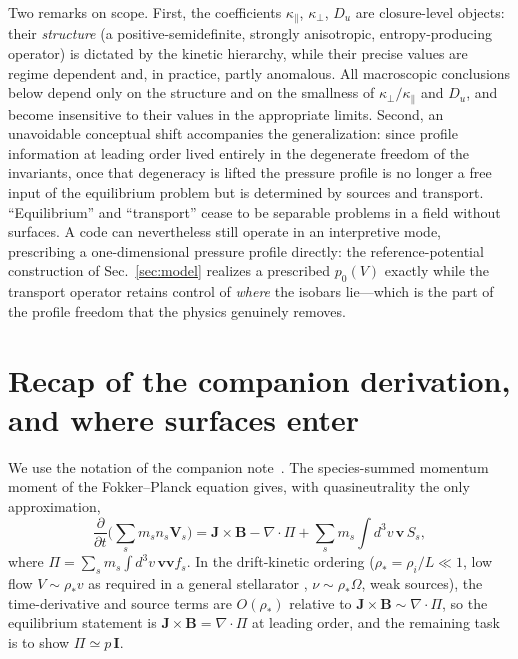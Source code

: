 \documentclass[english]{article}
\newcommand{\bB}{\mathbf{B}}
\newcommand{\bJ}{\mathbf{J}}
\newcommand{\bv}{\mathbf{v}}
\newcommand{\bV}{\mathbf{V}}
\newcommand{\bI}{\mathbf{I}}
\begin{document}
Two remarks on scope. First, the coefficients $\kappa_\parallel$, $\kappa_\perp$, $D_u$ are
closure-level objects: their \emph{structure} (a positive-semidefinite, strongly anisotropic,
entropy-producing operator) is dictated by the kinetic hierarchy, while their precise values are
regime dependent and, in practice, partly anomalous. All macroscopic conclusions below depend only
on the structure and on the smallness of $\kappa_\perp/\kappa_\parallel$ and $D_u$, and become
insensitive to their values in the appropriate limits. Second, an unavoidable conceptual shift
accompanies the generalization: since profile information at leading order lived entirely in the
degenerate freedom of the invariants, once that degeneracy is lifted the pressure profile is no
longer a free input of the equilibrium problem but is determined by sources and transport.
``Equilibrium'' and ``transport'' cease to be separable problems in a field without surfaces. A
code can nevertheless still operate in an interpretive mode, prescribing a one-dimensional
pressure profile directly: the reference-potential construction of Sec.~\ref{sec:model} realizes a
prescribed $p_0(V)$ exactly while the transport operator retains control of \emph{where} the
isobars lie---which is the part of the profile freedom that the physics genuinely removes.

\section{Recap of the companion derivation, and where surfaces enter}
\label{sec:recap}

We use the notation of the companion note~\cite{landreman_note}. The species-summed momentum moment
of the Fokker--Planck equation gives, with quasineutrality the only approximation,
\begin{equation}
\frac{\partial}{\partial t}\Big(\sum_s m_s n_s\bV_s\Big)
=\bJ\times\bB-\nabla\cdot\Pi+\sum_s m_s\!\int d^3v\,\bv\,S_s ,
\label{eq:total_momentum}
\end{equation}
where $\Pi=\sum_s m_s\int d^3v\,\bv\bv f_s$. In the drift-kinetic ordering
($\rho_*=\rho_i/L\ll1$, low flow $V\sim\rho_* v$ as required in a general stellarator
\cite{helander2007}, $\nu\sim\rho_*\Omega$, weak sources), the time-derivative and source terms are
$O(\rho_*)$ relative to $\bJ\times\bB\sim\nabla\cdot\Pi$, so the equilibrium statement is
$\bJ\times\bB=\nabla\cdot\Pi$ at leading order, and the remaining task is to show
$\Pi\simeq p\,\bI$.
\end{document}
